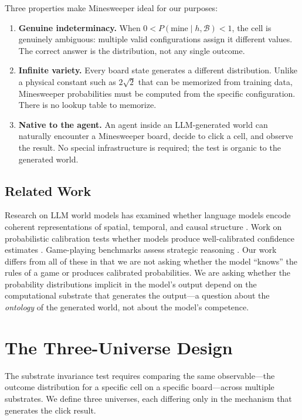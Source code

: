 \documentclass[12pt,a4paper]{article}
\begin{document}
Three properties make Minesweeper ideal for our purposes:

\begin{enumerate}[nosep]
    \item \textbf{Genuine indeterminacy.} When $0 < P(\text{mine} \mid h, \mathcal{B}) < 1$, the cell is genuinely ambiguous: multiple valid configurations assign it different values. The correct answer is the distribution, not any single outcome.
    \item \textbf{Infinite variety.} Every board state generates a different distribution. Unlike a physical constant such as $2\sqrt{2}$ that can be memorized from training data, Minesweeper probabilities must be computed from the specific configuration. There is no lookup table to memorize.
    \item \textbf{Native to the agent.} An agent inside an LLM-generated world can naturally encounter a Minesweeper board, decide to click a cell, and observe the result. No special infrastructure is required; the test is organic to the generated world.
\end{enumerate}

\subsection{Related Work}
\label{sec:related}

Research on LLM world models has examined whether language models encode coherent representations of spatial, temporal, and causal structure \citep{li2023emergent,gurnee2024}. Work on probabilistic calibration tests whether models produce well-calibrated confidence estimates \citep{kadavath2022}. Game-playing benchmarks assess strategic reasoning \citep{tian2024}. Our work differs from all of these in that we are not asking whether the model ``knows'' the rules of a game or produces calibrated probabilities. We are asking whether the probability distributions implicit in the model's output depend on the computational substrate that generates the output---a question about the \emph{ontology} of the generated world, not about the model's competence.

\section{The Three-Universe Design}
\label{sec:three_universes}

The substrate invariance test requires comparing the same observable---the outcome distribution for a specific cell on a specific board---across multiple substrates. We define three universes, each differing only in the mechanism that generates the click result.
\end{document}
